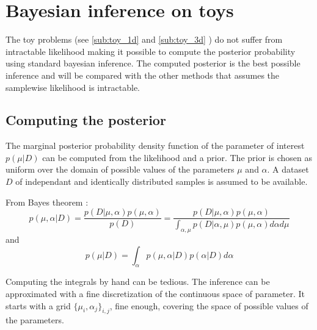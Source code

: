 \section{Bayesian inference on toys} %
\label{sec:bayesian_inference_on_toys}


The toy problems (see \autoref{sub:toy_1d} and \autoref{sub:toy_3d} ) do not suffer from intractable likelihood making it possible to compute the posterior probability using standard bayesian inference.
The computed posterior is the best possible inference and will be compared with the other methods that assumes the samplewise likelihood is intractable.

\subsection{Computing the posterior} %
\label{sub:computing_the_posterior}

The marginal posterior probability density function of the parameter of interest $p(\mu|D)$ can be computed from the likelihood and a prior.
The prior is chosen as uniform over the domain of possible values of the parameters $\mu$ and $\alpha$.
A dataset $D$ of independant and identically distributed samples is assumed to be available.

From Bayes theorem : 
\begin{equation}
    p(\mu, \alpha | D) = \frac{p(D|\mu, \alpha) p(\mu, \alpha)}{p(D)} = \frac{p(D|\mu, \alpha) p(\mu, \alpha)}{\int_{\alpha, \mu} p(D|\alpha, \mu) p(\mu, \alpha) d\alpha d\mu}
\end{equation}
and
\begin{equation}
	p(\mu|D) = \int_{\alpha} p(\mu, \alpha | D) p(\alpha|D) d\alpha
\end{equation}

Computing the integrals by hand can be tedious.
The inference can be approximated with a fine discretization of the continuous space of parameter.
It starts with a grid $\{\mu_i, \alpha_j\}_{i,j}$, fine enough, covering the space of possible values of the parameters.

